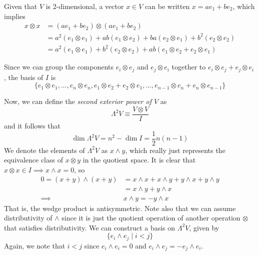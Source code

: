 \documentclass{article}
\begin{document}
    \begin{example}
    Given that $V$ is 2-dimensional, a vector $x \in V$ can be written $x = a e_1 + b e_2$, which implies
    \begin{align*}
        x \otimes x & = (a e_1 + b e_2) \otimes (a e_1 + b e_2) \\
        & = a^2 (e_1 \otimes e_1) + a b (e_1 \otimes e_2) + b a (e_2 \otimes e_1) + b^2 (e_2 \otimes e_2) \\
        & = a^2 (e_1 \otimes e_1) + b^2 (e_2 \otimes e_2) + a b (e_1 \otimes e_2 + e_2 \otimes e_1) 
    \end{align*}
    \end{example}

    Since we can group the components $e_i \otimes e_j$ and $e_j \otimes e_i$ together to $e_i \otimes e_j + e_j \otimes e_i$, the basis of $I$ is 
    \[\{e_1 \otimes e_1, ..., e_n \otimes e_n, e_1 \otimes e_2 + e_2 \otimes e_1, ..., e_{n-1} \otimes e_n + e_n \otimes e_{n-1}\}\]

    \begin{definition}
    Now, we can define the \textit{second exterior power of $V$} as
    \[\Lambda^2 V \equiv \frac{V \otimes V}{I}\]
    and it follows that 
    \[\dim{\Lambda^2 V} = n^2 - \dim{I} = \frac{1}{2} n (n-1)\]
    We denote the elements of $\Lambda^2 V$ as $x \wedge y$, which really just represents the equivalence class of $x \otimes y$ in the quotient space. It is clear that $x \otimes x \in I \implies x \wedge x = 0$, so
    \begin{align*}
        0 = (x + y) \wedge (x + y) & = x \wedge x + x \wedge y + y \wedge x + y \wedge y \\
        & = x \wedge y + y \wedge x \\
        \implies & x \wedge y = - y \wedge x
    \end{align*}
    That is, the wedge product is antisymmetric. Note also that we can assume distributivity of $\wedge$ since it is just the quotient operation of another operation $\otimes$ that satisfies distributivity. We can construct a basis on $\Lambda^2 V$, given by 
    \[\{e_i \wedge e_j \; | \; i < j\}\]
    Again, we note that $i < j$ since $e_i \wedge e_i = 0$ and $e_i \wedge e_j = - e_j \wedge e_i$. 
    \end{definition}
\end{document}
